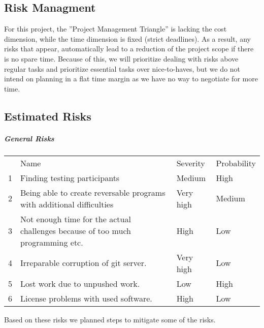 \subsection{Risk Managment}
For this project, the ”Project Management Triangle” is lacking the cost dimension, while the time dimension is fixed (strict deadlines). As a result, any risks that appear, automatically lead to a reduction of the project scope if there is no spare time. Because of this, we will prioritize dealing with risks above regular tasks and prioritize essential tasks over nice-to-haves, but we do not intend on planning in a flat time margin as we have no way to negotiate for more time.

\subsection{Estimated Risks}

\subparagraph{General Risks}
\begin{table}[]
    \begin{tabular}{llll}
      & Name                                                                           & Severity  & Probability \\
    1 & Finding testing participants                                                   & Medium    & High        \\
    2 & Being able to create reversable programs with additional difficulties          & Very high & Medium      \\
    3 & Not enough time for the actual challenges because of too much programming etc. & High      & Low         \\
    4 & Irreparable corruption of git server.                                          & Very high & Low         \\
    5 & Lost work due to unpushed work.                                                & Low       & High        \\
    6 & License problems with used software.                                           & High      & Low        
    \end{tabular}
\end{table}

Based on these risks we planned steps to mitigate some of the risks.

